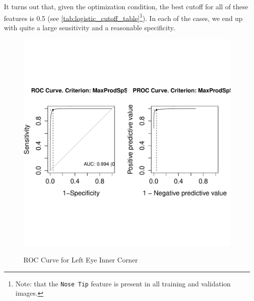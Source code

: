 \documentclass[journal]{IEEEtran}
\begin{document}
It turns out that, given the optimization condition, the best cutoff for all of these features is 0.5 (see \cref{tab:logistic_cutoff_table}\footnote{Note: that the \texttt{Nose Tip} feature is present in all training and validation images.}).  In each of the cases, we end up with quite a large sensitivity and a reasonable specificity.

\begin{figure}[!htb]
  \centering
  \caption{ROC Curve for Left Eye Inner Corner}
  \includegraphics[scale=.5]{roc_left_eye_inner_corner.pdf}
  \label{fig:roc_left_eye_inner_corner}
\end{figure}
\end{document}
